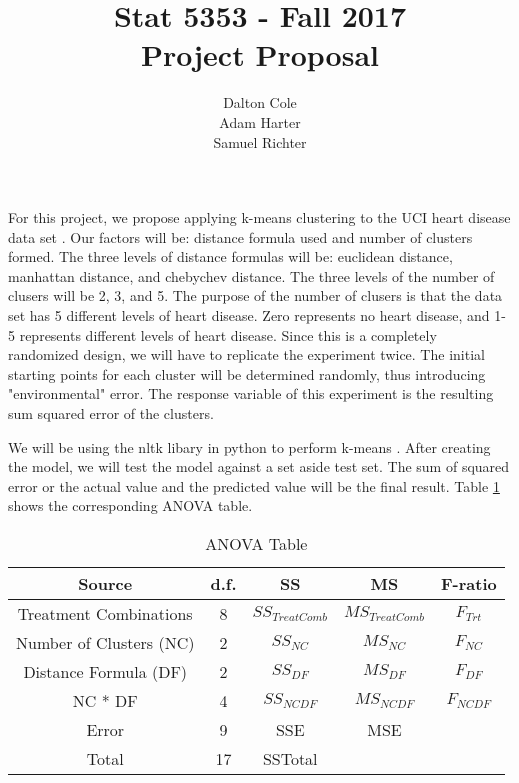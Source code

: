 \documentclass[times]{article}
\begin{document}
	\title{Stat 5353  - Fall 2017 \\ Project Proposal}
	\author{Dalton Cole \\ Adam Harter \\ Samuel Richter}
	\date{}
	\maketitle
	
	For this project, we propose applying k-means clustering to the UCI heart disease data set \cite{ref:uci}. Our factors will be: distance formula used and number of clusters formed. The three levels of distance formulas will be: euclidean distance, manhattan distance, and chebychev distance. The three levels of the number of clusers will be 2, 3, and 5. The purpose of the number of clusers is that the data set has 5 different levels of heart disease. Zero represents no heart disease, and 1-5 represents different levels of heart disease. Since this is a completely randomized design, we will have to replicate the experiment twice. The initial starting points for each cluster will be determined randomly, thus introducing "environmental" error. The response variable of this experiment is the resulting sum squared error of the clusters.

	We will be using the nltk libary in python to perform k-means \cite{ref:nltk}. After creating the model, we will test the model against a set aside test set. The sum of squared error or the actual value and the predicted value will be the final result. Table \ref{tab:anova} shows the corresponding ANOVA table.

	\begin{table}[!h]
		\centering
		\caption{ANOVA Table}
		\label{tab:anova}
		\begin{tabular}{| c | c | c | c | c |}
			\hline
			Source 					& d.f.	& SS	& MS 	& F-ratio \\
			\hline
			Treatment Combinations	& 8		& $SS_{Treat Comb}$	& $MS_{Treat Comb}$	& $F_{Trt}$		\\
			\hline
			Number of Clusters (NC)	& 2		& $SS_{NC}$			& $MS_{NC}$			& $F_{NC}$ 		\\
			\hline
			Distance Formula (DF)	& 2		& $SS_{DF}$			& $MS_{DF}$			& $F_{DF}$ 		\\
			\hline
			NC * DF					& 4 	& $SS_{NC DF}$		& $MS_{NC DF}$		& $F_{NC DF}$ 	\\
			\hline
			Error					& 9 	& SSE				& MSE				& 				\\
			\hline
			Total					& 17 	& SSTotal			& 					& 				\\
			\hline
		\end{tabular}
	\end{table}

	\medskip
	
	
\end{document}
